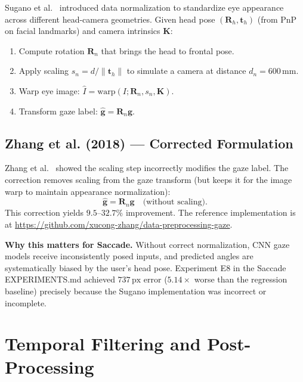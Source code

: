 \documentclass[11pt,a4paper]{article}
\begin{document}
Sugano et al.~\cite{sugano2014learning} introduced data normalization to standardize eye appearance across different head-camera geometries.
Given head pose $(\mathbf{R}_h, \mathbf{t}_h)$ (from PnP on facial landmarks) and camera intrinsics $\mathbf{K}$:

\begin{enumerate}
  \item Compute rotation $\mathbf{R}_n$ that brings the head to frontal pose.
  \item Apply scaling $s_n = d/\|\mathbf{t}_h\|$ to simulate a camera at distance $d_n = 600\,\text{mm}$.
  \item Warp eye image: $\hat{I} = \text{warp}(I; \mathbf{R}_n, s_n, \mathbf{K})$.
  \item Transform gaze label: $\hat{\mathbf{g}} = \mathbf{R}_n \mathbf{g}$.
\end{enumerate}

\subsection{Zhang et al. (2018) --- Corrected Formulation}

Zhang et al.~\cite{zhang2018revisiting} showed the scaling step incorrectly modifies the gaze label.
The correction removes scaling from the gaze transform (but keeps it for the image warp to maintain appearance normalization):
\begin{equation}
  \hat{\mathbf{g}} = \mathbf{R}_n \mathbf{g} \quad \text{(without scaling)}.
\end{equation}
This correction yields $9.5$--$32.7\%$ improvement.
The reference implementation is at \url{https://github.com/xucong-zhang/data-preprocessing-gaze}.

\textbf{Why this matters for Saccade.} Without correct normalization, CNN gaze models receive inconsistently posed inputs, and predicted angles are systematically biased by the user's head pose. Experiment E8 in the Saccade EXPERIMENTS.md achieved $737\,\text{px}$ error ($5.14\times$ worse than the regression baseline) precisely because the Sugano implementation was incorrect or incomplete.

\section{Temporal Filtering and Post-Processing}
\label{sec:temporal}
\end{document}
